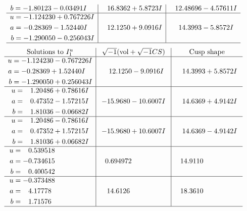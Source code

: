 \documentclass[1p]{elsarticle_modified}
\theoremstyle{definition}
\newcommand{\I}{\sqrt{-1}}
\begin{document}
$$\begin{array}{c|c|c}
\begin{aligned}
b &= -1.80123 - 0.03491 I\end{aligned}
 & \phantom{-}16.8362 + 5.8723 I & \phantom{-}12.48696 - 4.57611 I \\ \hline\begin{aligned}
u &= -1.124230 + 0.767226 I \\
a &= -0.28369 - 1.52440 I \\
b &= -1.290050 - 0.256043 I\end{aligned}
 & \phantom{-}12.1250 + 9.0916 I & \phantom{-}14.3993 - 5.8572 I\\
 \hline 
 \end{array}$$\newpage$$\begin{array}{c|c|c}  
\text{Solutions to }I^u_{1}& \I (\text{vol} + \sqrt{-1}CS) & \text{Cusp shape}\\
 \hline 
\begin{aligned}
u &= -1.124230 - 0.767226 I \\
a &= -0.28369 + 1.52440 I \\
b &= -1.290050 + 0.256043 I\end{aligned}
 & \phantom{-}12.1250 - 9.0916 I & \phantom{-}14.3993 + 5.8572 I \\ \hline\begin{aligned}
u &= \phantom{-}1.20486 + 0.78616 I \\
a &= \phantom{-}0.47352 - 1.57215 I \\
b &= \phantom{-}1.81036 - 0.06682 I\end{aligned}
 & -15.9680 - 10.6007 I & \phantom{-}14.6369 + 4.9142 I \\ \hline\begin{aligned}
u &= \phantom{-}1.20486 - 0.78616 I \\
a &= \phantom{-}0.47352 + 1.57215 I \\
b &= \phantom{-}1.81036 + 0.06682 I\end{aligned}
 & -15.9680 + 10.6007 I & \phantom{-}14.6369 - 4.9142 I \\ \hline\begin{aligned}
u &= \phantom{-}0.539518\phantom{ +0.000000I} \\
a &= -0.734615\phantom{ +0.000000I} \\
b &= \phantom{-}0.400542\phantom{ +0.000000I}\end{aligned}
 & \phantom{-}0.694972\phantom{ +0.000000I} & \phantom{-}14.9110\phantom{ +0.000000I} \\ \hline\begin{aligned}
u &= -0.373488\phantom{ +0.000000I} \\
a &= \phantom{-}4.17778\phantom{ +0.000000I} \\
b &= \phantom{-}1.71576\phantom{ +0.000000I}\end{aligned}
 & \phantom{-}14.6126\phantom{ +0.000000I} & \phantom{-}18.3610\phantom{ +0.000000I}\\
 \hline 
 \end{array}$$\newpage\newpage\renewcommand{\arraystretch}{1}
\end{document}
